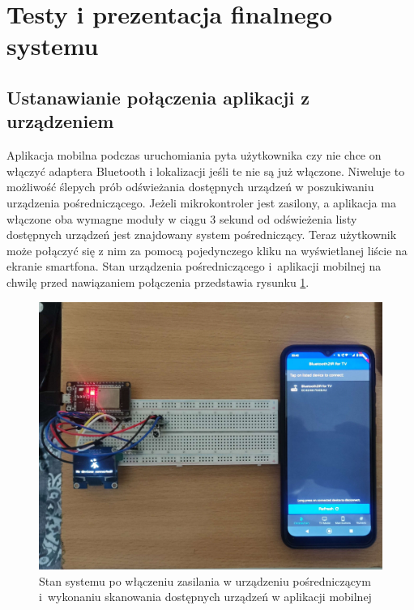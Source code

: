 \documentclass[12pt,twoside]{article}
\begin{document}

\clearpage



\section{Testy i prezentacja finalnego systemu}
\subsection{Ustanawianie połączenia aplikacji z urządzeniem}
Aplikacja mobilna podczas uruchomiania pyta użytkownika czy nie chce on włączyć adaptera Bluetooth i lokalizacji jeśli te nie są już włączone. Niweluje to możliwość ślepych prób odświeżania dostępnych urządzeń w poszukiwaniu urządzenia pośredniczącego. Jeżeli mikrokontroler jest zasilony, a aplikacja ma włączone oba wymagne moduły w ciągu 3 sekund od odświeżenia listy dostępnych urządzeń jest znajdowany system pośredniczący. Teraz użytkownik może połączyć się z nim za pomocą pojedynczego kliku na wyświetlanej liście na ekranie smartfona. Stan urządzenia pośredniczącego i~aplikacji mobilnej na chwilę przed nawiązaniem połączenia przedstawia rysunku \ref*{Fig:scanTest}.

\begin{figure}[ht]
   \centering
   \includegraphics[width=13cm]{images/scanTest.jpg}
   \caption{Stan systemu po włączeniu zasilania w urządzeniu pośredniczącym i~wykonaniu skanowania dostępnych urządzeń w aplikacji mobilnej}
   \label{Fig:scanTest}
\end{figure}
\end{document}
